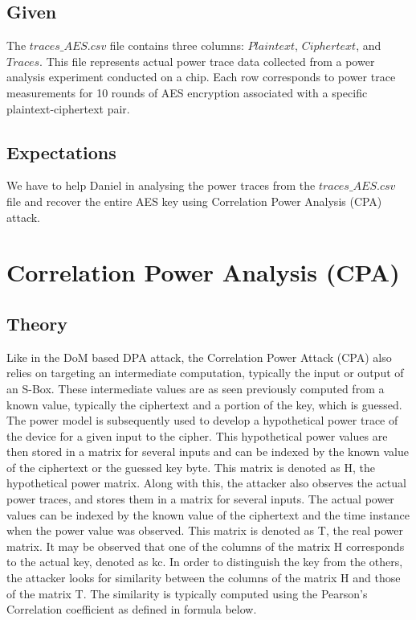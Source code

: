 \documentclass[12pt, letterpaper, oneside]{report}
\begin{document}
\section{Given}

The $traces\_AES.csv$ file contains three columns: $Plaintext$, $Ciphertext$, and $Traces$. 
This file represents actual power trace data collected from a power analysis experiment conducted on a chip. 
Each row corresponds to power trace measurements for 10 rounds of AES encryption associated with a specific plaintext-ciphertext pair.

\section{Expectations}

We have to help Daniel in analysing the power traces from the $traces\_AES.csv$ file and recover the entire AES key using Correlation Power Analysis (CPA) attack.

\chapter{Correlation Power Analysis (CPA)}

\section{Theory}

Like in the DoM based DPA attack, the Correlation Power Attack (CPA) also relies on targeting an intermediate computation, typically the input or output of an S-Box. These intermediate values are as seen previously computed from a known value, typically the ciphertext and a portion of the key, which is guessed. The power model is subsequently used to develop a hypothetical power trace of the device for a given input to the cipher. This hypothetical power values are then stored in a matrix for several inputs and can be indexed by the known value of the ciphertext or the guessed key byte. This matrix is denoted as H, the hypothetical power matrix. Along with this, the attacker also observes the actual power traces, and stores them in a matrix for several inputs. The actual power values can be indexed by the known value of the ciphertext and the time instance when the power value was observed. This matrix is denoted as T, the real power matrix. It may be observed that one of the columns of the matrix H corresponds to the actual key, denoted as kc. In order to distinguish the key from the others, the attacker looks for similarity between the columns of the matrix H and those of the matrix T. The similarity is typically computed
using the Pearson’s Correlation coeﬃcient as defined in formula below. 
\end{document}
